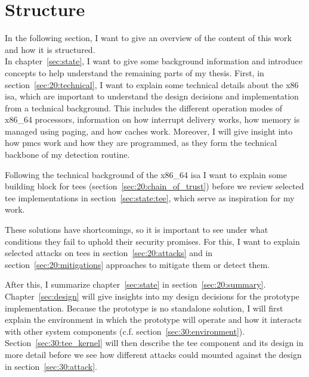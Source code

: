 \section{Structure}
\label{sec:10_structure}
In the following section, I want to give an overview of the content of this work
and how it is structured.\\

In chapter~\ref{sec:state}, I want to give some background information and
introduce concepts to help understand the remaining parts of my
thesis. First, in section~\ref{sec:20:technical}, I want to explain some
technical details about the x86 \gls{isa}, which are important to understand the
design decisions and implementation from a technical background. This includes
the different operation modes of x86\_64 processors, information on how
interrupt delivery works, how memory is managed using paging, and how caches
work. Moreover, I will give insight into how \glspl{pmc} work and how they are
programmed, as they form the technical backbone of my detection routine.

Following the technical background of the x86\_64 \gls{isa} I want to explain
some building block for \glspl{tee} (section~\ref{sec:20:chain_of_trust}) before
we review selected \gls{tee} implementations in section~\ref{sec:state:tee},
which serve as inspiration for my work.

These solutions have shortcomings, so it is important to see under
what conditions they fail to uphold their security promises. For this, I want
to explain selected attacks on \glspl{tee} in section~\ref{sec:20:attacks} and
in section~\ref{sec:20:mitigations} approaches to mitigate them or detect them.

After this, I summarize chapter~\ref{sec:state} in
section~\ref{sec:20:summary}.\\

Chapter~\ref{sec:design} will give insights into my design decisions for
the prototype implementation. Because the prototype is no standalone solution, I
will first explain the environment in which the prototype will operate and how
it interacts with other system components (c.f.
section~\ref{sec:30:environment}). Section~\ref{sec:30:tee_kernel} will then
describe the \gls{tee} component and its design in more detail before we
see how different attacks could mounted against the design in
section~\ref{sec:30:attack}.\\

